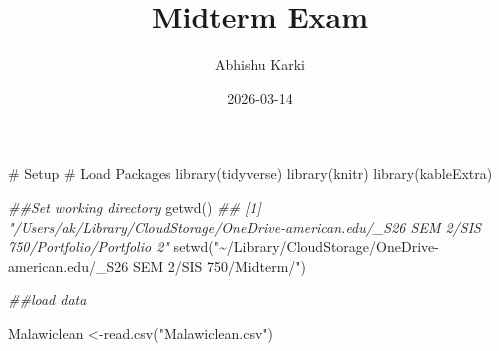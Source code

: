 \documentclass[
  letterpaper,
  DIV=11,
  numbers=noendperiod]{scrartcl}
\title{Midterm Exam}
\author{Abhishu Karki}
\date{2026-03-14}
\newenvironment{Shaded}{\begin{snugshade}}{\end{snugshade}}
\newcommand{\CommentTok}[1]{\textcolor[rgb]{0.37,0.37,0.37}{#1}}
\newcommand{\DocumentationTok}[1]{\textcolor[rgb]{0.37,0.37,0.37}{\textit{#1}}}
\newcommand{\FunctionTok}[1]{\textcolor[rgb]{0.28,0.35,0.67}{#1}}
\newcommand{\NormalTok}[1]{\textcolor[rgb]{0.00,0.23,0.31}{#1}}
\newcommand{\OtherTok}[1]{\textcolor[rgb]{0.00,0.23,0.31}{#1}}
\newcommand{\StringTok}[1]{\textcolor[rgb]{0.13,0.47,0.30}{#1}}
\begin{document}
\maketitle


\begin{Shaded}
\begin{Highlighting}[]
\CommentTok{\# Setup}
\CommentTok{\# Load Packages}
\FunctionTok{library}\NormalTok{(tidyverse)}
\FunctionTok{library}\NormalTok{(knitr)}
\FunctionTok{library}\NormalTok{(kableExtra)}

\DocumentationTok{\#\#Set working directory}
\FunctionTok{getwd}\NormalTok{()}
\DocumentationTok{\#\# [1] "/Users/ak/Library/CloudStorage/OneDrive{-}american.edu/\_S\textquotesingle{}26 SEM 2/SIS 750/Portfolio/Portfolio 2"}
\FunctionTok{setwd}\NormalTok{(}\StringTok{"\textasciitilde{}/Library/CloudStorage/OneDrive{-}american.edu/\_S\textquotesingle{}26 SEM 2/SIS 750/Midterm/"}\NormalTok{)}

\DocumentationTok{\#\#load data}

\NormalTok{Malawiclean }\OtherTok{\textless{}{-}}\FunctionTok{read.csv}\NormalTok{(}\StringTok{"Malawiclean.csv"}\NormalTok{)}
\end{Highlighting}
\end{Shaded}
\end{document}
